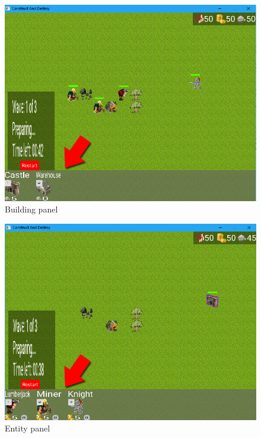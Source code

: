 \begin{figure}[!htb]
    \centering
    \includegraphics[scale=0.6]{res/building-panel.png}
    \caption{Building panel}\label{fig:building-panel}
\end{figure}

\begin{figure}[!htb]
    \centering
    \includegraphics[scale=0.6]{res/entity-panel.png}
    \caption{Entity panel}\label{fig:entity-panel}
\end{figure}

